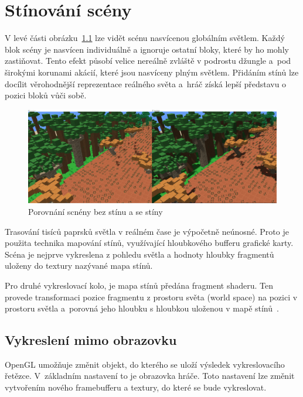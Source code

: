 \documentclass[thesis=M,czech]{FITthesis}[2019/12/23]
\begin{document}
\chapter{Stínování scény}

V levé části obrázku~\ref{fig:shadows_intro} lze vidět scénu nasvícenou globálním světlem. Každý blok scény je nasvícen individuálně a ignoruje ostatní bloky, které by ho mohly zastiňovat. Tento efekt působí velice nereálně zvláště v podrostu džungle a~pod širokými korunami akácií, které jsou nasvíceny plným světlem. Přidáním stínů lze docílit věrohodnější reprezentace reálného světa a~hráč získá lepší představu o pozici bloků vůči sobě.

\begin{figure}\centering
	\includegraphics[width=\textwidth]{images/shadows/intro}
	\caption[Porovnání scnény bez stínu a se stíny]{Porovnání scnény bez stínu a se stíny}\label{fig:shadows_intro}
\end{figure}

Trasování tisíců paprsků světla v reálném čase je výpočetně neúnosné. Proto je použita technika mapování stínů, využívající hloubkového bufferu grafické karty. Scéna je nejprve vykreslena z pohledu světla a hodnoty hloubky fragmentů uloženy do textury nazývané mapa stínů.

Pro druhé vykreslovací kolo, je mapa stínů předána fragment shaderu. Ten provede transformaci pozice fragmentu z prostoru světa (world space) na pozici v prostoru světla a~porovná jeho hloubku s hloubkou uloženou v mapě stínů~\cite{lopgl_shadows}.

\section{Vykreslení mimo obrazovku}

OpenGL umožňuje změnit objekt, do kterého se uloží výsledek vykreslovacího řetězce. V~základním nastavení to je obrazovka hráče. Toto nastavení lze změnit vytvořením nového framebufferu a textury, do které se bude vykreslovat.
\end{document}
